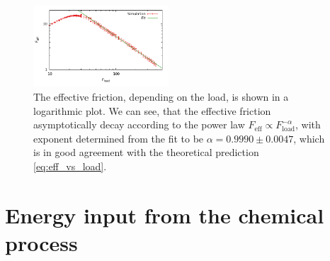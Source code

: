 \documentclass[aps,pre,twocolumn,showpacs,showkeys,a4paper]{revtex4}
\begin{document}
\begin{figure}[b]
\centering
\includegraphics[width=0.45\textwidth,height=!]{eff_frict_decay}
\caption{The effective friction, depending on the load, is shown in a logarithmic plot. 
We can see, that the effective friction asymptotically decay according to the power law $F_\text{eff} \propto F_\text{load}^{-\alpha}$, 
with exponent determined from the fit to be $\alpha = 0.9990 \pm 0.0047$, 
which is in good agreement with the theoretical prediction \eqref{eq:eff_vs_load}.
}
\label{Fig: eff_frict_decay}
\end{figure}


\section{Energy input from the chemical process}
\end{document}
